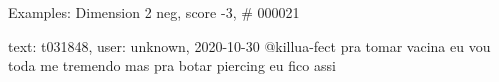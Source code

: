 \begin{frame}{Examples: Dimension 2 neg, score -3, \# 000021}
\footnotesize
\begin{alertblock}{text: t031848, user: unknown, 2020-10-30}
@killua-fect pra tomar vacina eu vou toda me tremendo mas pra botar piercing eu 
fico assi  
 \textbf{} 
\textbf{} 
\end{alertblock}
\end{frame}
